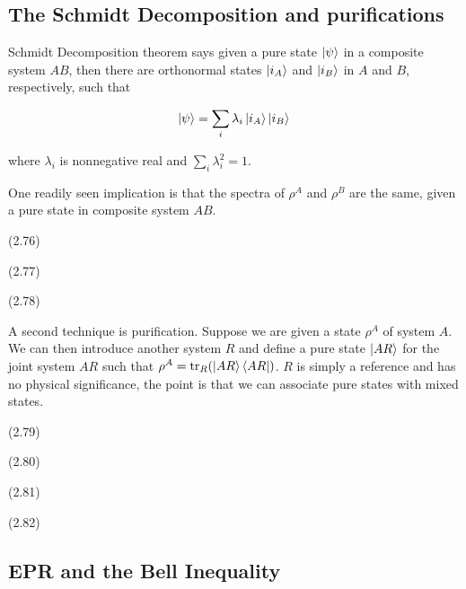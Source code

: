 \documentclass[main.tex]{subfiles}
\begin{document}
\begin{subappendices}
\subsection{The Schmidt Decomposition and purifications}

Schmidt Decomposition theorem says given a pure state $\ket{\psi}$ in a composite system $AB$, then there are orthonormal states $\ket{i_A}$ and $\ket{i_B}$ in $A$ and $B$, respectively, such that

\begin{align*}
\ket{\psi} = \sum_i \lambda_i \ket{i_A}\ket{i_B}	
\end{align*}

where $\lambda_i$ is nonnegative real and $\sum_i \lambda_i^2 = 1$.

One readily seen implication is that the spectra of $\rho^A$ and $\rho^B$ are the same, given a pure state in composite system $AB$. 

\begin{exercise}(2.76)
\end{exercise}

\begin{exercise}(2.77)
\end{exercise}

\begin{exercise}(2.78)
\end{exercise}

A second technique is purification. Suppose we are given a state $\rho^A$ of system $A$. We can then introduce another system $R$ and define a pure state $\ket{AR}$ for the joint system $AR$ such that $\rho^A = \tr_R (\ket{AR}\bra{AR})$. $R$ is simply a reference and has no physical significance, the point is that we can associate pure states with mixed states.

\begin{exercise}(2.79)
\end{exercise}

\begin{exercise}(2.80)
\end{exercise}

\begin{exercise}(2.81)
\end{exercise}

\begin{exercise}(2.82)
\end{exercise}

\subsection{EPR and the Bell Inequality}  


\end{subappendices}
\end{document}
